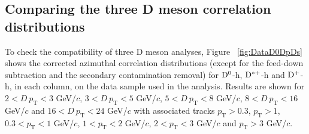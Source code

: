 \label{results}
\subsection{Comparing the three D meson correlation distributions}
To check the compatibility of three D meson analyses, Figure ~\ref{fig:DataD0DpDs} shows the corrected azimuthal correlation distributions (except for the feed-down subtraction and the secondary contamination removal) for ${\rm D^0}$-h, ${\rm D^{*+}}$-h and ${\rm D^+}$-h, in each column, on the data sample used in the analysis. Results are shown for $2 < D\ p_\text{T} < 3$ GeV/$c$, $3 < D\ p_\text{T} < 5$ GeV/$c$, $5 < D\ p_\text{T} < 8$ GeV/$c$, $8 < D \ p_\text{T} < 16$ GeV/$c$ and $16 < D\ p_\text{T} < 24$ GeV/$c$ with associated tracks $p_\text{T} > 0.3$, $p_\text{T} > 1$, $0.3 < p_\text{T} < 1$ GeV/$c$, $1 < p_\text{T} < 2$ GeV/$c$, $2 < p_\text{T} < 3$ GeV/$c$ and $ p_\text{T} > 3$ GeV/$c$.

